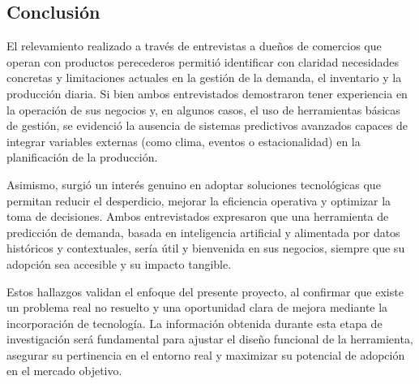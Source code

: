 \subsection{Conclusión}

\indent El relevamiento realizado a través de entrevistas a dueños de comercios que operan con productos perecederos permitió identificar con claridad necesidades concretas y limitaciones actuales en la gestión de la demanda, el inventario y la producción diaria. Si bien ambos entrevistados demostraron tener experiencia en la operación de sus negocios y, en algunos casos, el uso de herramientas básicas de gestión, se evidenció la ausencia de sistemas predictivos avanzados capaces de integrar variables externas (como clima, eventos o estacionalidad) en la planificación de la producción.

\indent Asimismo, surgió un interés genuino en adoptar soluciones tecnológicas que permitan reducir el desperdicio, mejorar la eficiencia operativa y optimizar la toma de decisiones. Ambos entrevistados expresaron que una herramienta de predicción de demanda, basada en inteligencia artificial y alimentada por datos históricos y contextuales, sería útil y bienvenida en sus negocios, siempre que su adopción sea accesible y su impacto tangible.

\indent Estos hallazgos validan el enfoque del presente proyecto, al confirmar que existe un problema real no resuelto y una oportunidad clara de mejora mediante la incorporación de tecnología. La información obtenida durante esta etapa de investigación será fundamental para ajustar el diseño funcional de la herramienta, asegurar su pertinencia en el entorno real y maximizar su potencial de adopción en el mercado objetivo.

